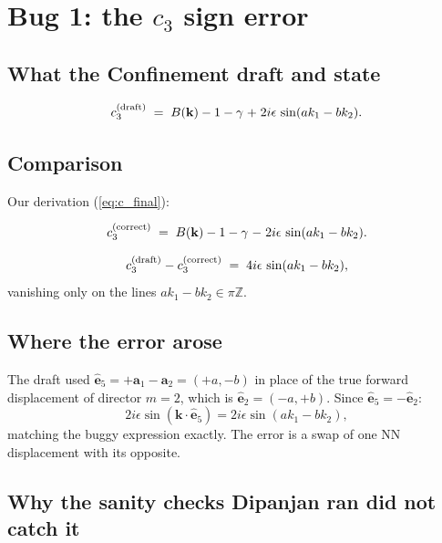 \documentclass[11pt,a4paper]{article}
\newcommand{\vk}{\mathbf{k}}
\newcommand{\va}[1]{\mathbf{a}_{#1}}
\newcommand{\veps}[1]{\hat{\mathbf{e}}_{#1}}
\begin{document}
\section{Bug 1: the $c_3$ sign error}\label{sec:c3-bug}

\subsection{What the Confinement draft and {} state}\label{ssec:dipanjan-c3}

\begin{buggybox}
\begin{equation}\label{eq:c3_dipanjan}
c_3^{\rm (draft)} \;=\; B(\vk) - 1 - \gamma \;\mathbf{+}\; 2 i \epsilon\, \sin(a k_1 - b k_2).
\end{equation}
\end{buggybox}

\subsection{Comparison}\label{ssec:c3-compare}

Our derivation (\ref{eq:c_final}):
\begin{correctbox}
\begin{equation}\label{eq:c3_correct}
c_3^{\rm (correct)} \;=\; B(\vk) - 1 - \gamma \;\mathbf{-}\; 2 i \epsilon\, \sin(a k_1 - b k_2).
\end{equation}
\end{correctbox}
\[
c_3^{\rm (draft)} - c_3^{\rm (correct)} \;=\; 4 i \epsilon\, \sin(a k_1 - b k_2),
\]
vanishing only on the lines $a k_1 - b k_2 \in \pi\mathbb{Z}$.

\subsection{Where the error arose}\label{ssec:c3-source}

The draft used $\veps{5} = +\va{1} - \va{2} = (+a, -b)$ in place of the
true forward displacement of director $m = 2$, which is
$\veps{2} = (-a, +b)$. Since $\veps{5} = -\veps{2}$:
\[
2 i \epsilon \sin(\vk \cdot \veps{5}) = 2 i \epsilon \sin(a k_1 - b k_2),
\]
matching the buggy expression exactly. The error is a swap of one NN
displacement with its opposite.

\subsection{Why the sanity checks Dipanjan ran did not catch it}\label{ssec:why-survived}
\end{document}
